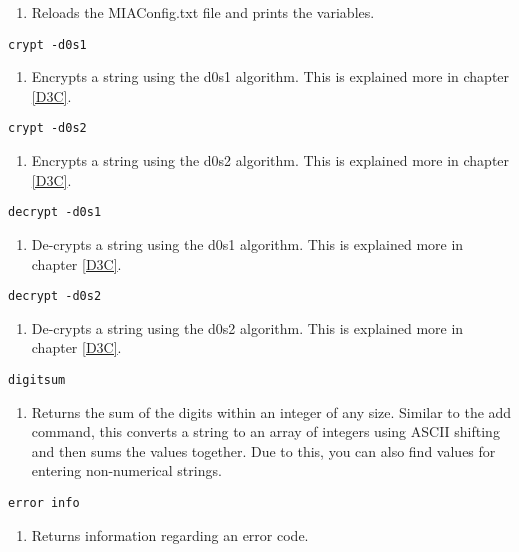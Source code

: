\begin{enumerate}
	\item[] Reloads the MIAConfig.txt file and prints the variables.
\end{enumerate}
\begin{lstlisting} 
crypt -d0s1   
\end{lstlisting}
\begin{enumerate}
	\item[] Encrypts a string using the d0s1 algorithm. This is explained more in chapter \ref{D3C}.
\end{enumerate}
\begin{lstlisting} 
crypt -d0s2  
\end{lstlisting}
\begin{enumerate}
	\item[] Encrypts a string using the d0s2 algorithm. This is explained more in chapter \ref{D3C}.
\end{enumerate}
\begin{lstlisting} 
decrypt -d0s1   
\end{lstlisting}
\begin{enumerate}
	\item[] De-crypts a string using the d0s1 algorithm. This is explained more in chapter \ref{D3C}.
\end{enumerate}
\begin{lstlisting} 
decrypt -d0s2   
\end{lstlisting}
\begin{enumerate}
	\item[] De-crypts a string using the d0s2 algorithm. This is explained more in chapter \ref{D3C}.
\end{enumerate}
\begin{lstlisting} 
digitsum 
\end{lstlisting}
\begin{enumerate}
	\item[] Returns the sum of the digits within an integer of any size. Similar to the add command, this converts a string to an array of integers using ASCII shifting and then sums the values together. Due to this, you can also find values for entering non-numerical strings.
\end{enumerate}
\begin{lstlisting} 
error info
\end{lstlisting}
\begin{enumerate}
	\item[] Returns information regarding an error code.
\end{enumerate}
